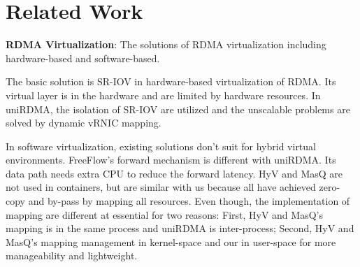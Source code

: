 \section{Related Work}

\textbf{RDMA Virtualization}: The solutions of RDMA virtualization including hardware-based and software-based.

The basic solution is SR-IOV in hardware-based virtualization of RDMA. Its virtual layer is in the hardware and are limited by hardware resources. In uniRDMA, the isolation of SR-IOV are utilized and the unscalable problems are solved by dynamic vRNIC mapping. 

In software virtualization, existing solutions don’t suit for hybrid virtual environments. FreeFlow's forward mechanism is different with uniRDMA. Its data path needs extra CPU to reduce the forward latency. HyV and MasQ are not used in containers, but are similar with us because all have achieved zero-copy and by-pass by mapping all resources. Even though, the implementation of mapping are different at essential for two reasons: First, HyV and MasQ's mapping is in the same process and uniRDMA is inter-process; Second, HyV and MasQ's mapping management in kernel-space and our in user-space for more manageability and lightweight.
